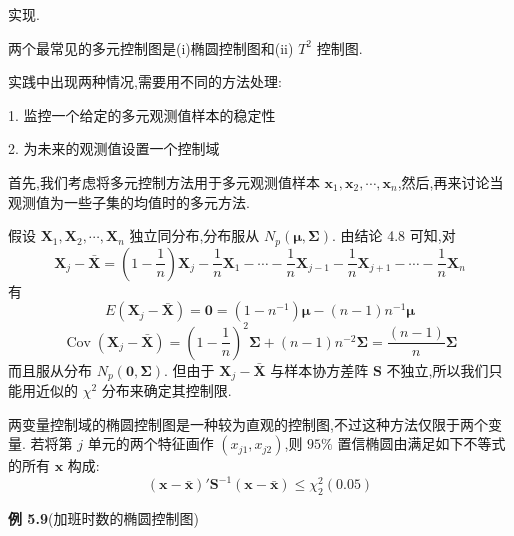 实现.

两个最常见的多元控制图是(i)椭圆控制图和(ii) $T^{2}$ 控制图.

实践中出现两种情况,需要用不同的方法处理:

1. 监控一个给定的多元观测值样本的稳定性

2. 为未来的观测值设置一个控制域

首先,我们考虑将多元控制方法用于多元观测值样本 $\mathbf{x}_1,\mathbf{x}_2,\cdots,\mathbf{x}_n$,然后,再来讨论当观测值为一些子集的均值时的多元方法.


假设 $\mathbf{X}_1,\mathbf{X}_2,\cdots,\mathbf{X}_n$ 独立同分布,分布服从 $N_p(\boldsymbol{\mu},\boldsymbol{\Sigma})$. 由结论 4.8 可知,对
\[
\mathbf{X}_j-\bar{\mathbf{X}}=\left(1-\frac{1}{n}\right)\mathbf{X}_j-\frac{1}{n}\mathbf{X}_1-\cdots-\frac{1}{n}\mathbf{X}_{j-1}-\frac{1}{n}\mathbf{X}_{j+1}-\cdots-\frac{1}{n}\mathbf{X}_n
\]
有
\[
E(\mathbf{X}_j-\bar{\mathbf{X}})=\mathbf{0}=(1-n^{-1})\boldsymbol{\mu}-(n-1)n^{-1}\boldsymbol{\mu}
\]
\[
\operatorname{Cov}(\mathbf{X}_j-\bar{\mathbf{X}})=\left(1-\frac{1}{n}\right)^{2}\boldsymbol{\Sigma}+(n-1)n^{-2}\boldsymbol{\Sigma}=\frac{(n-1)}{n}\boldsymbol{\Sigma}
\]
而且服从分布 $N_p(\mathbf{0},\boldsymbol{\Sigma})$. 但由于 $\mathbf{X}_j-\bar{\mathbf{X}}$ 与样本协方差阵 $\mathbf{S}$ 不独立,所以我们只能用近似的 $\chi^{2}$ 分布来确定其控制限.

\quad 两变量控制域的椭圆控制图是一种较为直观的控制图,不过这种方法仅限于两个变量. 若将第 $j$ 单元的两个特征画作 $(x_{j1},x_{j2})$,则 $95\%$ 置信椭圆由满足如下不等式的所有 $\mathbf{x}$ 构成:
\label{eq:5-32}
\begin{equation}
(\mathbf{x}-\bar{\mathbf{x}})'\mathbf{S}^{-1}(\mathbf{x}-\bar{\mathbf{x}})\leqslant\chi_2^{2}(0.05)
\tag{5-32}
\end{equation}

\noindent\textbf{例 5.9}\quad (加班时数的椭圆控制图)

